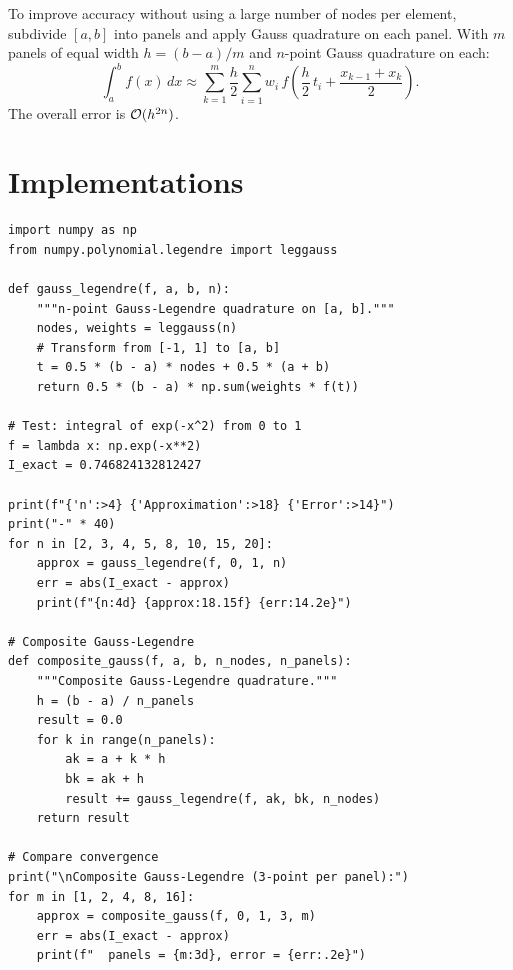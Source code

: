 \begin{method}
To improve accuracy without using a large number of nodes per element, subdivide $[a,b]$ into panels and apply Gauss quadrature on each panel. With $m$ panels of equal width $h = (b-a)/m$ and $n$-point Gauss quadrature on each:
\[
    \int_a^b f(x)\,dx \approx \sum_{k=1}^{m} \frac{h}{2} \sum_{i=1}^{n} w_i\, f\!\left(\frac{h}{2}\,t_i + \frac{x_{k-1}+x_k}{2}\right).
\]
The overall error is $\mathcal{O}(h^{2n})$.
\end{method}

\section{Implementations}

\begin{codeblock}[title=\textbf{Python --- Gauss--Legendre quadrature}]
\begin{verbatim}
import numpy as np
from numpy.polynomial.legendre import leggauss

def gauss_legendre(f, a, b, n):
    """n-point Gauss-Legendre quadrature on [a, b]."""
    nodes, weights = leggauss(n)
    # Transform from [-1, 1] to [a, b]
    t = 0.5 * (b - a) * nodes + 0.5 * (a + b)
    return 0.5 * (b - a) * np.sum(weights * f(t))

# Test: integral of exp(-x^2) from 0 to 1
f = lambda x: np.exp(-x**2)
I_exact = 0.746824132812427

print(f"{'n':>4} {'Approximation':>18} {'Error':>14}")
print("-" * 40)
for n in [2, 3, 4, 5, 8, 10, 15, 20]:
    approx = gauss_legendre(f, 0, 1, n)
    err = abs(I_exact - approx)
    print(f"{n:4d} {approx:18.15f} {err:14.2e}")

# Composite Gauss-Legendre
def composite_gauss(f, a, b, n_nodes, n_panels):
    """Composite Gauss-Legendre quadrature."""
    h = (b - a) / n_panels
    result = 0.0
    for k in range(n_panels):
        ak = a + k * h
        bk = ak + h
        result += gauss_legendre(f, ak, bk, n_nodes)
    return result

# Compare convergence
print("\nComposite Gauss-Legendre (3-point per panel):")
for m in [1, 2, 4, 8, 16]:
    approx = composite_gauss(f, 0, 1, 3, m)
    err = abs(I_exact - approx)
    print(f"  panels = {m:3d}, error = {err:.2e}")
\end{verbatim}
\end{codeblock}

